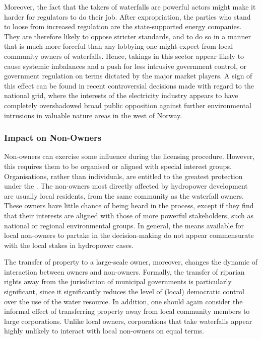 Moreover, the fact that the takers of waterfalls are powerful actors might make it harder for regulators to do their job. After expropriation, the parties who stand to loose from increased regulation are the state-supported energy companies. They are therefore likely to oppose stricter standards, and to do so in a manner that is much more forceful than any lobbying one might expect from local community owners of waterfalls. Hence, takings in this sector appear likely to cause systemic imbalances and a push for less intrusive government control, or government regulation on terms dictated by the major market players. A sign of this effect can be found in recent controversial decisions made with regard to the national grid, where the interests of the electricity industry appears to have completely overshadowed broad public opposition against further environmental intrusions in valuable nature areas in the west of Norway.

\subsubsection{Impact on Non-Owners}

Non-owners can exercise some influence during the licensing procedure. However, this requires them to be organised or aligned with special interest groups. Organisations, rather than individuals, are entitled to the greatest protection under the \cite{wra17}. The non-owners most directly affected by hydropower development are usually local residents, from the same community as the waterfall owners. These owners have little chance of being heard in the process, except if they find that their interests are aligned with those of more powerful stakeholders, such as national or regional environmental groups. In general, the means available for local non-owners to partake in the decision-making do not appear commensurate with the local stakes in hydropower cases.

The transfer of property to a large-scale owner, moreover, changes the dynamic of interaction between owners and non-owners. Formally, the transfer of riparian rights away from the jurisdiction of municipal governments is particularly significant, since it significantly reduces the level of (local) democratic control over the use of the water resource. In addition, one should again consider the informal effect of transferring property away from local community members to large corporations. Unlike local owners, corporations that take waterfalls appear highly unlikely to interact with local non-owners on equal terms. %

